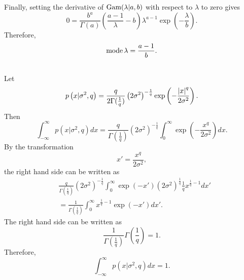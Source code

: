 Finally, setting the derivative of ${\rm Gam}(\lambda | a, b)$ with respect to $\lambda$ to zero gives
%
\begin{equation}
0
=
\frac{b ^ a}{\Gamma(a)}
\left(
	\frac{a - 1}{\lambda}
	-
	b
\right)
\lambda ^ {a - 1}
\exp
\left(
	-
	\frac{\lambda}{b}
\right).
\end{equation}
%
Therefore,
%
\begin{equation}
\operatorname{mode} \lambda
=
\frac{a - 1}{b}.
\end{equation}
%


\subsection{}
\label{2.43}
Let
%
\begin{equation}
p
\left(
	x 
	| 
	\sigma ^ 2, 
	q
\right)
=
\frac{q}{2 \Gamma(\frac{1}{q})} 
\left( 2 \sigma ^ 2 \right) ^ {- \frac{1}{q}}
\exp 
\left( 
	-
	\frac{\abs{x} ^ q}{2 \sigma ^ 2}
\right).
\end{equation}
%
Then
%
\begin{equation}
\int_{- \infty}^{\infty}
p
\left(
	x 
	| 
	\sigma ^ 2, 
	q
\right)
dx
=
\frac{q}{\Gamma(\frac{1}{q})} 
\left( 
	2 \sigma ^ 2 
\right) ^ {- \frac{1}{q}}
\int_{0}^{\infty}
\exp 
\left( 
	-
	\frac{x ^ q}{2 \sigma ^ 2}
\right)
dx.
\end{equation}
%
By the transformation 
%
\begin{equation}
x'
=
\frac{x ^ q}{2 \sigma ^ 2},
\end{equation}
%
the right hand side can be written as
%
\begin{equation}
\begin{aligned}
&
\frac{q}{\Gamma(\frac{1}{q})} 
\left( 2 \sigma ^ 2 \right) ^ {- \frac{1}{q}}
\int_{0}^{\infty}
\exp ( - x' )
\left(
	2 \sigma ^ 2 
\right) ^ {\frac{1}{q}}
\frac{1}{q}
x ^ {\frac{1}{q} - 1}
dx' 
\\
&=
\frac{1}{\Gamma(\frac{1}{q})}
\int_{0}^{\infty}
x ^ {\frac{1}{q} - 1}
\exp ( - x' )
dx'.
\end{aligned}
\end{equation}
%
The right hand side can be written as
%
\begin{equation}
\frac{1}{\Gamma(\frac{1}{q})}
\Gamma 
\left( 
	\frac{1}{q} 
\right)
=
1.
\end{equation}
%
Therefore,
%
\begin{equation}
\int_{- \infty}^{\infty}
p
\left(
	x 
	| 
	\sigma ^ 2, 
	q
\right)
dx
=
1.
\end{equation}
%

